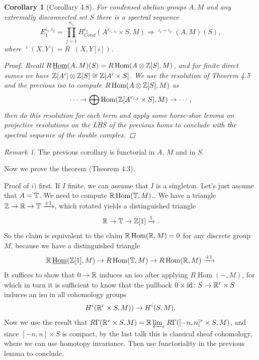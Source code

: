 \documentclass[A4paper, british]{amsart}
\theoremstyle{darkgreentheorem}
\newtheorem{cor}[thm]{Corollary}
\theoremstyle{darkbluedefinition}
\theoremstyle{darkredexample}
\theoremstyle{remark}
\newtheorem{rem}[thm]{Remark}
\DeclareMathOperator{\Hom}{Hom}
\DeclareMathOperator{\ihom}{\underline{Hom}}
\DeclareMathOperator{\iext}{\underline{Ext}}
\newcommand{\1}{\mathbbm{1}}
\newcommand{\ot}{\otimes}
\newcommand{\id}{\mathrm{id}}
\newcommand{\tms}{\times}
\begin{document}
\begin{cor}[Corollary 4.8]
    For condensed abelian groups $A,M$ and any extremally disconnected set $S$ there is a spectral sequence
    \[ E_{1}^{i_{1},i_{2}}=\prod_{j=1}^{n_{i_{1}}}H^{i_{2}}_{Cond}(A^{r_{i_{1},i_{2}}}\tms S,M)\Rightarrow \iext^{i_{1}+i_{2}}(A,M)(S),\]
    where $\iext^{i}(X,Y)=R\ihom(X,Y[i])$.
    \begin{proof}
	Recall $R\ihom(A,M)(S)=R\Hom(A\ot\Z[S],M)$, and for finite direct sumes we have $\Z[A^{i}]\ot \Z[S]\cong \Z[A^{i}\tms S]$.
	We use the resolution of Theorem 4.5 and the previous iso to compute $R\Hom(A\ot \Z[S],M)$ as
	\[ \cdots \to \bigoplus \Hom(\Z[A^{r_{i,j}}\tms S],M)\to \cdots, \]
	then do this resolution for each term and apply some horse-shoe lemma on projective resolutions on the LHS of the previous homs to conclude with the spectral sequence of the double complex.
    \end{proof}
\end{cor}

\begin{rem}
    The previous corollary is functorial in $A$, $M$ and in $S$.
\end{rem}

Now we prove the theorem (Theorem 4.3).

Proof of $i)$ first.
If $I$ finite, we can assume that $I$ is a singleton.
Let's just assume that $A=\mathbb{T}$.
We need to compute $\R\Hom(\bbT,M)$..
We have a triangle $\mathbb{Z}\to \mathbb{R}\to \mathbb{T}\xrightarrow{+1}$, which rotated yields a distinguished triangle
\[ \mathbb{R}\to \mathbb{T}\to \mathbb{Z}[1]\xrightarrow{1}.\]
So the claim is equivalent to the claim $\R\Hom(\R,M)=0$ for any discrete group $M$, because we have a distinguished triangle
\[ \R\ihom(\Z[1],M)\to R\Hom(\bbT,M)\to R\Hom(\R,M) \xrightarrow{+1}\]
It suffices to show that $0\to \mathbb{R}$ induces an iso after applying $R\Hom(-,M)$, for which in turn it is sufficient to know that the pullback $0\times \id \colon S\to \R^{r}\times S$ induces an iso in all cohomology groups
\[ H^{i}(\mathbb{R}^{r}\times S,M))\to H^{i}(S,M). \]
Now we use the result that $R\Gamma(\R^{r}\tms S,M)=\R\varprojlim_{r}R\Gamma([-n,n]^{r}\tms S,M)$, and since $[-n,n]\tms S$ is compact, by the last talk this is classical sheaf cohomology, where we can use homotopy invariance.
Then use functoriality in the previous lemma to conclude.
\end{document}
